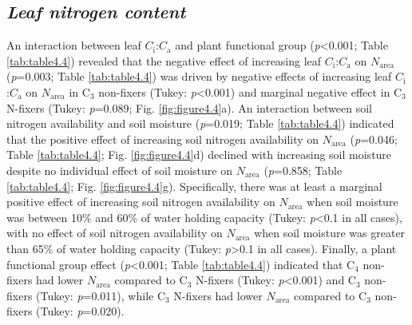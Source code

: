 \subsection{\textit{Leaf nitrogen content}}
\noindent An interaction between leaf $C_\mathrm{i}$:$C_\mathrm{a}$ and plant functional group (\textit{p}<0.001; Table \ref{tab:table4.4}) revealed that the negative effect of increasing leaf $C_\mathrm{i}$:$C_\mathrm{a}$ on $N_\mathrm{area}$ (\textit{p}=0.003; Table \ref{tab:table4.4}) was driven by negative effects of increasing leaf $C_\mathrm{i}$:$C_\mathrm{a}$ on $N_\mathrm{area}$ in C$_3$ non-fixers (Tukey: \textit{p}<0.001) and marginal negative effect in C$_3$ N-fixers (Tukey: \textit{p}=0.089; Fig. \ref{fig:figure4.4}a). An interaction between soil nitrogen availability and soil moisture (\textit{p}=0.019; Table \ref{tab:table4.4}) indicated that the positive effect of increasing soil nitrogen availability on $N_\mathrm{area}$ (\textit{p}=0.046; Table \ref{tab:table4.4}; Fig. \ref{fig:figure4.4}d) declined with increasing soil moisture despite no individual effect of soil moisture on $N_\mathrm{area}$ (\textit{p}=0.858; Table \ref{tab:table4.4}; Fig. \ref{fig:figure4.4}g). Specifically, there was at least a marginal positive effect of increasing soil nitrogen availability on $N_\mathrm{area}$ when soil moisture was between 10\% and 60\% of water holding capacity (Tukey: \textit{p}<0.1 in all cases), with no effect of soil nitrogen availability on $N_\mathrm{area}$ when soil moisture was greater than 65\% of water holding capacity (Tukey: \textit{p}>0.1 in all cases). Finally, a plant functional group effect (\textit{p}<0.001; Table \ref{tab:table4.4}) indicated that C$_4$ non-fixers had lower $N_\mathrm{area}$ compared to C$_3$ N-fixers (Tukey: \textit{p}<0.001) and C$_3$ non-fixers (Tukey: \textit{p}=0.011), while C$_3$ N-fixers had lower $N_\mathrm{area}$ compared to C$_3$ non-fixers (Tukey: \textit{p}=0.020).

